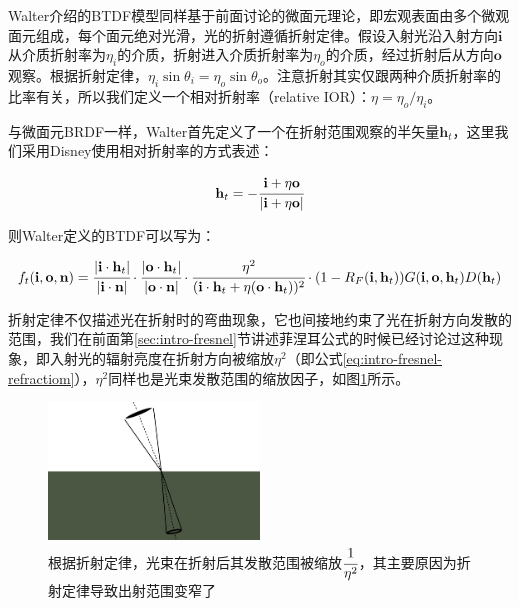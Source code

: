 Walter介绍的BTDF模型同样基于前面讨论的微面元理论，即宏观表面由多个微观面元组成，每个面元绝对光滑，光的折射遵循折射定律。假设入射光沿入射方向$\mathbf{i}$从介质折射率为$\eta_i$的介质，折射进入介质折射率为$\eta_o$的介质，经过折射后从方向$\mathbf{o}$观察。根据折射定律，$\eta_i \sin\theta_i=\eta_o \sin\theta_o$。注意折射其实仅跟两种介质折射率的比率有关，所以我们定义一个相对折射率（relative IOR）：$\eta=\eta_o/\eta_i$。

与微面元BRDF一样，Walter首先定义了一个在折射范围观察的半矢量$\mathbf{h}_t$，这里我们采用Disney使用相对折射率的方式表述：

\begin{equation}
	\mathbf{h}_t=- \cfrac{\mathbf{i}+\eta\mathbf{o}}{|\mathbf{i}+\eta\mathbf{o}|}
\end{equation}

\noindent 则Walter定义的BTDF可以写为：

\begin{equation}
	f_t(\mathbf{i},\mathbf{o},\mathbf{n})= \cfrac{|\mathbf{i}\cdot\mathbf{h}_t|}{|\mathbf{i}\cdot\mathbf{n}|}\cdot \cfrac{|\mathbf{o}\cdot\mathbf{h}_t|}{|\mathbf{o}\cdot\mathbf{n}|}\cdot \cfrac{\eta^2}{(\mathbf{i}\cdot\mathbf{h}_t+\eta(\mathbf{o}\cdot\mathbf{h}_t))^2}\cdot (1-R_F(\mathbf{i},\mathbf{h}_t))G(\mathbf{i},\mathbf{o},\mathbf{h}_t)D(\mathbf{h}_t)
\end{equation}

折射定律不仅描述光在折射时的弯曲现象，它也间接地约束了光在折射方向发散的范围，我们在前面第\ref{sec:intro-fresnel}节讲述菲涅耳公式的时候已经讨论过这种现象，即入射光的辐射亮度在折射方向被缩放$\eta^2$（即公式\ref{eq:intro-fresnel-refractiom}），$\eta^2$同样也是光束发散范围的缩放因子，如图\ref{f:intro-fresnel-fraction}所示。

\begin{figure}
	\sidecaption
\includegraphics[width=0.5\textwidth]{figures/intro/refraction}
	\caption{根据折射定律，光束在折射后其发散范围被缩放$ \cfrac{1}{\eta^2}$，其主要原因为折射定律导致出射范围变窄了}
	\label{f:intro-fresnel-fraction}
\end{figure}


